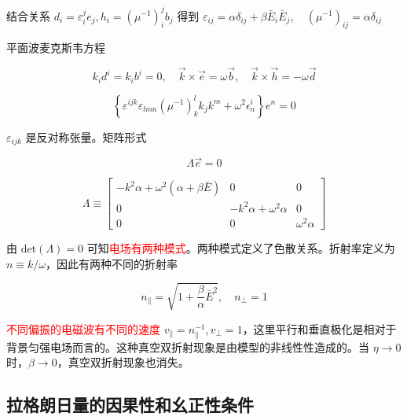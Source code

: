 \documentclass[9pt, dvipsnames]{beamer} %
\begin{document}
\begin{frame}    
    结合关系 $d_i=\varepsilon_i^j e_j,h_i=\left(\mu^{-1} \right)_i^j b_j $ 得到
    $
    \varepsilon_{ij} = \alpha\delta_{ij} + \beta\bar{E}_i\bar{E}_j ,\quad
    \left(\mu^{-1} \right)_{ij} = \alpha\delta_{ij} 
    $
    
    平面波麦克斯韦方程
    
    $$
    k_i d^i = k_i b^i = 0,\quad
    \vec{k}\times\vec{e} = \omega\vec{b},\quad
    \vec{k}\times\vec{h} = -\omega\vec{d} 
    $$
    
    
    $$
    \left\{\varepsilon^{ijk}\varepsilon_{lmn} \left(\mu^{-1} \right)_k^l k_j k^m+\omega^2\epsilon_n^i \right\}e^n = 0
    $$
    
    $\varepsilon_{ijk} $ 是反对称张量。矩阵形式
    
    $$
    \Lambda \vec{e} = 0 
    $$
    
    $$
    \Lambda
    \equiv \begin{bmatrix}
    -k^2 \alpha+\omega^2\left(\alpha+\beta\bar{E} \right) &0 &0 \\
    0 &-k^2\alpha+\omega^2\alpha &0 \\
    0 &0 &\omega^2\alpha
    \end{bmatrix} 
    $$
    
    由 $\mathrm{det}(\Lambda)=0 $ 可知\textcolor{red}{电场有两种模式}。两种模式定义了色散关系。折射率定义为 $n\equiv k/\omega $，因此有两种不同的折射率
    
    $$
    n_\parallel = \sqrt{1+\frac{\beta }{\alpha } \bar{E}^2},\quad
    n_\perp = 1 
    $$
    
    \textcolor{red}{不同偏振的电磁波有不同的速度} $v_\parallel=n_\parallel^{-1},v_\perp=1 $，这里平行和垂直极化是相对于背景匀强电场而言的。这种真空双折射现象是由模型的非线性性造成的。当 $\eta\to 0$ 时，$\beta\to 0$，真空双折射现象也消失。
\end{frame}

\subsection{拉格朗日量的因果性和幺正性条件}
\end{document}
